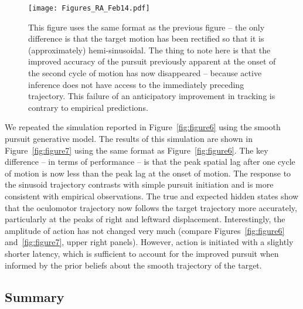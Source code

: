 \documentclass[a4paper]{article} %
\begin{document}
\begin{figure}%
 \centerline{%
 \texttt{[image: Figures\_RA\_Feb14.pdf]} %
}%
\caption{This figure uses the same format as the previous
figure -- the only difference is that the target motion has been
rectified so that it is (approximately) hemi-sinusoidal. The thing to
note here is that the improved accuracy of the pursuit previously
apparent at the onset of the second cycle of motion has now disappeared
-- because active inference does not have access to the immediately
preceding trajectory. This failure of an anticipatory improvement in
tracking is contrary to empirical predictions.}%
\label{fig:figure8}
\end{figure}

We repeated the simulation reported in Figure~\ref{fig:figure6} using the smooth pursuit
generative model. The results of this simulation are shown in Figure~\ref{fig:figure7}
using the same format as Figure~\ref{fig:figure6}. The key difference -- in terms of
performance -- is that the peak spatial lag after one cycle of motion is
now less than the peak lag at the onset of motion. The response to the
sinusoid trajectory contrasts with simple pursuit initiation and is more
consistent with empirical observations. The true and expected hidden
states show that the oculomotor trajectory now follows the target
trajectory more accurately, particularly at the peaks of right and
leftward displacement. Interestingly, the amplitude of action has not
changed very much (compare Figures~\ref{fig:figure6} and~\ref{fig:figure7}, upper right panels).
However, action is initiated with a slightly shorter latency, which is
sufficient to account for the improved pursuit when informed by the
prior beliefs about the smooth trajectory of the target.

\subsection{Summary}
\end{document}
